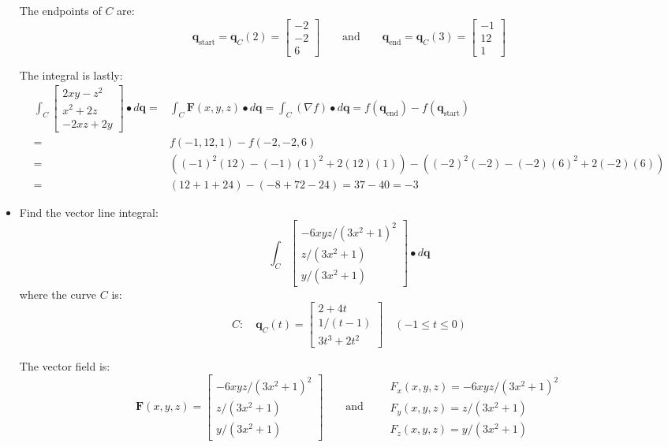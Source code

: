 \documentclass{article}
\begin{document}
\begin{itemize}
The endpoints of \(C\) are: 
\[\mathbf{q}_{\text{start}} = \mathbf{q}_C(2) = \begin{bmatrix} -2 \\ -2 \\ 6 \end{bmatrix}
\quad\quad\text{and}\quad\quad 
\mathbf{q}_{\text{end}} = \mathbf{q}_C(3) = \begin{bmatrix} -1 \\ 12 \\ 1 \end{bmatrix}\]

The integral is lastly:
\begin{align*}
\int_C \begin{bmatrix}
2xy - z^2 \\ 
x^2 + 2z \\ 
-2xz + 2y
\end{bmatrix} \bullet d\mathbf{q} = & \int_C \mathbf{F}(x,y,z) \bullet d\mathbf{q} 
= \int_C (\nabla f) \bullet d\mathbf{q} 
= f(\mathbf{q}_{\text{end}}) - f(\mathbf{q}_{\text{start}}) \\  
= & f(-1, 12, 1) - f(-2, -2, 6) \\ 
= & ((-1)^2(12) - (-1)(1)^2 + 2(12)(1)) - ((-2)^2(-2) - (-2)(6)^2 + 2(-2)(6)) \\ 
= & (12 + 1 + 24) - (-8 + 72 - 24)  
= 37 - 40 = -3 
\end{align*}

\item
Find the vector line integral: 
\[\int_C \begin{bmatrix}
-6xyz/(3x^2 + 1)^2 \\ 
z/(3x^2 + 1) \\ 
y/(3x^2 + 1)
\end{bmatrix} \bullet d\mathbf{q}\]
where the curve \(C\) is:
\[C : \quad \mathbf{q}_C(t) = \begin{bmatrix}
2 + 4t \\ 
1/(t-1) \\ 
3t^3 + 2t^2
\end{bmatrix} \quad 
(-1 \leq t \leq 0)\]
 
The vector field is: 
\[\mathbf{F}(x,y,z) = \begin{bmatrix}
-6xyz/(3x^2 + 1)^2 \\ 
z/(3x^2 + 1) \\ 
y/(3x^2 + 1)
\end{bmatrix} \quad\quad\text{and}\quad\quad \begin{array}{l} 
F_x(x,y,z) = -6xyz/(3x^2 + 1)^2 \\ 
F_y(x,y,z) = z/(3x^2 + 1) \\ 
F_z(x,y,z) = y/(3x^2 + 1) 
\end{array}\]


\end{itemize}
\end{document}
